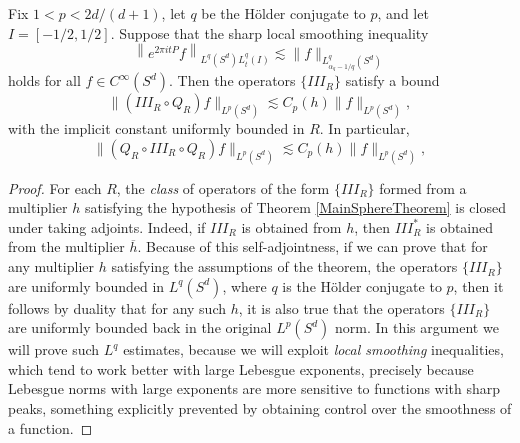 \begin{lemma} \label{LocalSmoothingLargeTimesTheorem}
    Fix $1 < p < 2d/(d+1)$, let $q$ be the H\"{o}lder conjugate to $p$, and let $I = [-1/2, 1/2]$. Suppose that the sharp local smoothing inequality
    \[ \left\| e^{2 \pi i t P} f \right\|_{L^q(S^d) L^q_t(I)} \lesssim \| f \|_{L^q_{\alpha_q-1/q}(S^d)} \]
    holds for all $f \in C^\infty(S^d)$. Then the operators $\{ III_R \}$ satisfy a bound
    \[ \| (III_R \circ Q_R) f \|_{L^p(S^d)} \lesssim C_p(h) \| f \|_{L^p(S^d)}, \]
    with the implicit constant uniformly bounded in $R$. In particular,
    \[ \| (Q_R \circ III_R \circ Q_R) f \|_{L^p(S^d)} \lesssim C_p(h) \| f \|_{L^p(S^d)}, \]
\end{lemma}
\begin{proof}
    For each $R$, the \emph{class} of operators of the form $\{ III_R \}$ formed from a multiplier $h$ satisfying the hypothesis of Theorem \ref{MainSphereTheorem} is closed under taking adjoints. Indeed, if $III_R$ is obtained from $h$, then $III_R^*$ is obtained from the multiplier $\overline{h}$. Because of this self-adjointness, if we can prove that for any multiplier $h$ satisfying the assumptions of the theorem, the operators $\{ III_R \}$ are uniformly bounded in $L^q(S^d)$, where $q$ is the H\"{o}lder conjugate to $p$, then it follows by duality that for any such $h$, it is also true that the operators $\{ III_R \}$ are uniformly bounded back in the original $L^p(S^d)$ norm. In this argument we will prove such $L^q$ estimates, because we will exploit \emph{local smoothing} inequalities, which tend to work better with large Lebesgue exponents, precisely because Lebesgue norms with large exponents are more sensitive to functions with sharp peaks, something explicitly prevented by obtaining control over the smoothness of a function.


\end{proof}
